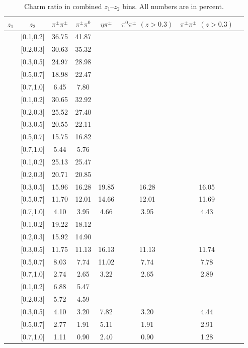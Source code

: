 \begin{table}[H]\footnotesize
\centering
\begin{tabular}{|c|c||c|c|c|c|c|c|}
\hline
 $z_1$& $z_2$ & $\pi^{\pm}\pi^{\pm}$ & $\pi^{\pm}\pi^0$ & $\eta\pi^{\pm}$ & $\pi^0\pi^{\pm}$ $(z>0.3)$ & $\pi^{\pm}\pi^{\pm}$ $(z>0.3)$ \\ \hline\hline
[0.1,0.2]	&	[0.1,0.2]	&	36.75	&	41.87	&		&		&		\\ \hline
[0.1,0.2]	&	[0.2,0.3]	&	30.63	&	35.32	&		&		&		\\ \hline
[0.1,0.2]	&	[0.3,0.5]	&	24.97	&	28.98	&		&		&		\\ \hline
[0.1,0.2]	&	[0.5,0.7]	&	18.98	&	22.47	&		&		&		\\ \hline
[0.1,0.2]	&	[0.7,1.0]	&	6.45	&	7.80	&		&		&		\\ \hline \hline
[0.2,0.3]	&	[0.1,0.2]	&	30.65	&	32.92	&		&		&		\\ \hline
[0.2,0.3]	&	[0.2,0.3]	&	25.52	&	27.40	&		&		&		\\ \hline
[0.2,0.3]	&	[0.3,0.5]	&	20.55	&	22.11	&		&		&		\\ \hline
[0.2,0.3]	&	[0.5,0.7]	&	15.75	&	16.82	&		&		&		\\ \hline
[0.2,0.3]	&	[0.7,1.0]	&	5.44	&	5.76	&		&		&		\\ \hline\hline
[0.3,0.5]	&	[0.1,0.2]	&	25.13	&	25.47	&		&		&		\\ \hline
[0.3,0.5]	&	[0.2,0.3]	&	20.71	&	20.85	&		&		&		\\ \hline
[0.3,0.5]	&	[0.3,0.5]	&	15.96	&	16.28	&	19.85	&	16.28	&	16.05	\\ \hline
[0.3,0.5]	&	[0.5,0.7]	&	11.70	&	12.01	&	14.66	&	12.01	&	11.69	\\ \hline
[0.3,0.5]	&	[0.7,1.0]	&	4.10	&	3.95	&	4.66	&	3.95	&	4.43	\\ \hline\hline
[0.5,0.7]	&	[0.1,0.2]	&	19.22	&	18.12	&		&		&		\\ \hline
[0.5,0.7]	&	[0.2,0.3]	&	15.92	&	14.90	&		&		&		\\ \hline
[0.5,0.7]	&	[0.3,0.5]	&	11.75	&	11.13	&	16.13	&	11.13	&	11.74	\\ \hline
[0.5,0.7]	&	[0.5,0.7]	&	8.03	&	7.74	&	11.02	&	7.74	&	7.78	\\ \hline
[0.5,0.7]	&	[0.7,1.0]	&	2.74	&	2.65	&	3.22	&	2.65	&	2.89	\\ \hline\hline
[0.7,1.0]	&	[0.1,0.2]	&	6.88	&	5.47	&		&		&		\\ \hline
[0.7,1.0]	&	[0.2,0.3]	&	5.72	&	4.59	&		&		&		\\ \hline
[0.7,1.0]	&	[0.3,0.5]	&	4.10	&	3.20	&	7.82	&	3.20	&	4.44	\\ \hline
[0.7,1.0]	&	[0.5,0.7]	&	2.77	&	1.91	&	5.11	&	1.91	&	2.91	\\ \hline
[0.7,1.0]	&	[0.7,1.0]	&	1.11	&	0.90	&	2.40	&	0.90	&	1.28	\\ \hline
\end{tabular}
\caption[Charm ratio in combined $z_{1}$--$z_{2}$ bins]{Charm ratio in combined $z_{1}$--$z_{2}$ bins. All numbers are in percent.}
\label{tab:comzcharmratio}
\end{table}

